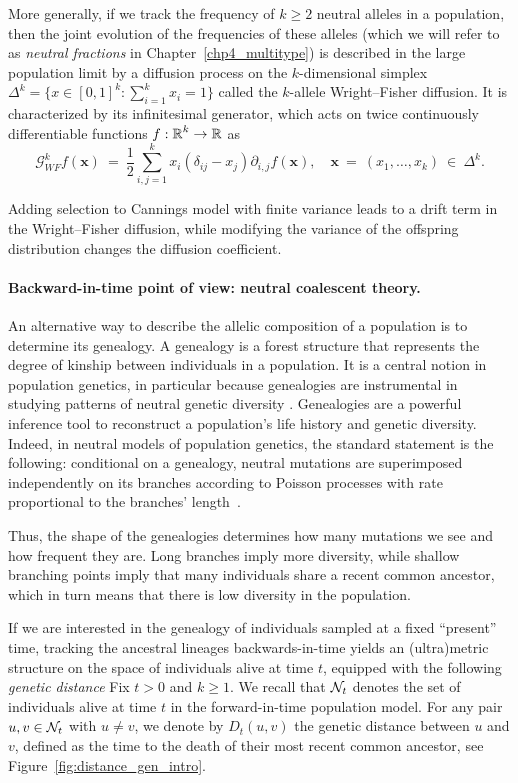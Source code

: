 More generally, if we track the frequency of $k\geq 2$ neutral alleles in a population, then the joint evolution of the frequencies of these alleles (which we will refer to as \emph{neutral fractions} in Chapter~\ref{chp4_multitype}) is described in the large population limit by a diffusion process on the $k$-dimensional simplex $\Delta^{k}=\{x\in[0,1]^{k}:\sum_{i=1}^{k}x_i = 1\}$ called the $k$-allele Wright--Fisher diffusion. It is characterized by its infinitesimal generator, which acts on twice continuously differentiable functions $f:\operatorname{\mathbb{R}}^{k}\to \operatorname{\mathbb{R}}$ as
\[
 \mathcal{G}^k_{WF} f(\bm x)\ =\ \frac{1}{2}\sum_{i,j=1}^k x_i(\delta_{ij}-x_j) \partial_{i,j}f(\bm x), \quad \bm x\ =\ (x_1,\dots,x_k)\ \in\ \Delta^k.
\]

Adding selection to Cannings model with finite variance leads to a drift term in the Wright--Fisher diffusion, while modifying the variance of the offspring distribution changes the diffusion coefficient. 
\paragraph{Backward-in-time point of view: neutral coalescent theory.}
An alternative way to describe the allelic composition of a population is to determine its genealogy. A genealogy is a forest structure that represents the degree of kinship
between individuals in a population. It is a central notion in population genetics, in particular because genealogies are instrumental in studying
patterns of neutral genetic diversity \citep{wakeley_coalescent_2009,
tellier2014coalescence}. Genealogies are a powerful inference tool to reconstruct a population's life history and genetic diversity. 
Indeed, in neutral models of population genetics, the standard statement is the following:
conditional on a genealogy, neutral mutations are superimposed independently on its branches according to Poisson processes with rate proportional to the branches' length~\cite{donnelly_coalescents_1995, griffiths_genealogy_2003}. 

Thus, the shape of the genealogies determines how many mutations we see and how frequent they are. Long branches imply more diversity, while shallow branching points imply that many individuals share a recent common ancestor, which in turn means that there is low diversity in the population. 

If we are interested in the genealogy of individuals sampled at a fixed ``present'' time, tracking the ancestral lineages backwards-in-time yields an (ultra)metric structure on the space of individuals alive at time $t$, equipped with the following \emph{genetic distance}
Fix $t>0$ and $k\geq 1$. We recall that ${\cal N}_t$ denotes the set of individuals alive at time $t$ in the forward-in-time population model.
For any pair $u,v \in{\cal N}_t$ with $u\neq v$, we denote by $D_{t}(u, v)$  the genetic distance between $u$ and $v$,  defined as the time to the death of their most recent common ancestor, see Figure~\ref{fig:distance_gen_intro}.

